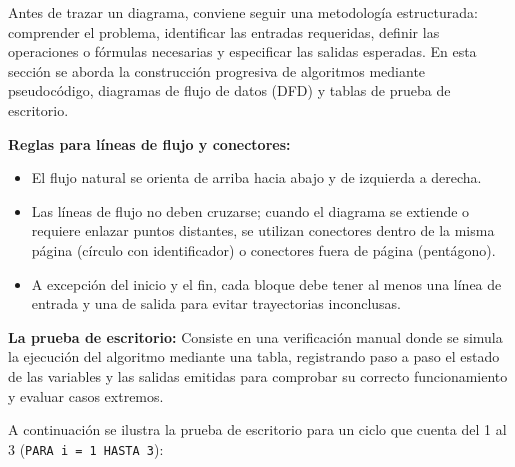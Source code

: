 Antes de trazar un diagrama, conviene seguir una metodología
estructurada: comprender el problema, identificar las entradas
requeridas, definir las operaciones o fórmulas necesarias y especificar
las salidas esperadas. En esta sección se aborda la construcción
progresiva de algoritmos mediante pseudocódigo, diagramas de flujo de
datos (DFD) y tablas de prueba de escritorio.

\textbf{Reglas para líneas de flujo y conectores:}

\begin{itemize}
\tightlist
\item
  El flujo natural se orienta de arriba hacia abajo y de izquierda a
  derecha.
\item
  Las líneas de flujo no deben cruzarse; cuando el diagrama se extiende
  o requiere enlazar puntos distantes, se utilizan conectores dentro de
  la misma página (círculo con identificador) o conectores fuera de
  página (pentágono).
\item
  A excepción del inicio y el fin, cada bloque debe tener al menos una
  línea de entrada y una de salida para evitar trayectorias inconclusas.
\end{itemize}

\textbf{La prueba de escritorio:} Consiste en una verificación manual
donde se simula la ejecución del algoritmo mediante una tabla,
registrando paso a paso el estado de las variables y las salidas
emitidas para comprobar su correcto funcionamiento y evaluar casos
extremos.

A continuación se ilustra la prueba de escritorio para un ciclo que
cuenta del 1 al 3 (\texttt{PARA\ i\ =\ 1\ HASTA\ 3}):

